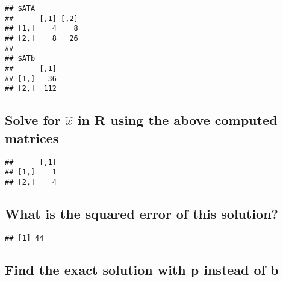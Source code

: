 \documentclass[]{article}
\newenvironment{Shaded}{\begin{snugshade}}{\end{snugshade}}
\newcommand{\KeywordTok}[1]{\textcolor[rgb]{0.13,0.29,0.53}{\textbf{{#1}}}}
\newcommand{\DecValTok}[1]{\textcolor[rgb]{0.00,0.00,0.81}{{#1}}}
\newcommand{\StringTok}[1]{\textcolor[rgb]{0.31,0.60,0.02}{{#1}}}
\newcommand{\CommentTok}[1]{\textcolor[rgb]{0.56,0.35,0.01}{\textit{{#1}}}}
\newcommand{\NormalTok}[1]{{#1}}
\begin{document}
\begin{verbatim}
## $ATA
##      [,1] [,2]
## [1,]    4    8
## [2,]    8   26
## 
## $ATb
##      [,1]
## [1,]   36
## [2,]  112
\end{verbatim}

\subsection{\texorpdfstring{Solve for \(\hat{x}\) in R using the above
computed
matrices}{Solve for \textbackslash{}hat\{x\} in R using the above computed matrices}}\label{solve-for-hatx-in-r-using-the-above-computed-matrices}

\begin{Shaded}
\end{Shaded}

\begin{verbatim}
##      [,1]
## [1,]    1
## [2,]    4
\end{verbatim}

\subsection{What is the squared error of this
solution?}\label{what-is-the-squared-error-of-this-solution}

\begin{Shaded}
\end{Shaded}

\begin{verbatim}
## [1] 44
\end{verbatim}

\subsection{Find the exact solution with p instead of
b}\label{find-the-exact-solution-with-p-instead-of-b}
\end{document}
